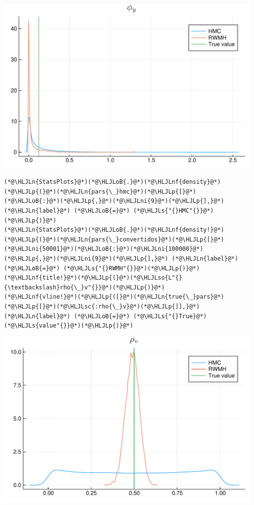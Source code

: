 \documentclass[12pt,a4paper]{article}
\newcommand{\HLJLn}[1]{#1}
\newcommand{\HLJLnf}[1]{\textcolor[RGB]{66,102,213}{#1}}
\newcommand{\HLJLs}[1]{\textcolor[RGB]{201,61,57}{#1}}
\newcommand{\HLJLsc}[1]{\textcolor[RGB]{201,61,57}{#1}}
\newcommand{\HLJLso}[1]{\textcolor[RGB]{201,61,57}{#1}}
\newcommand{\HLJLni}[1]{\textcolor[RGB]{59,151,46}{#1}}
\newcommand{\HLJLoB}[1]{\textcolor[RGB]{102,102,102}{\textbf{#1}}}
\newcommand{\HLJLp}[1]{#1}
\begin{document}
\includegraphics[width=\linewidth]{figures/dsge_and_julia_51_1.pdf}

\begin{lstlisting}
(*@\HLJLn{StatsPlots}@*)(*@\HLJLoB{.}@*)(*@\HLJLnf{density}@*)(*@\HLJLp{(}@*)(*@\HLJLn{pars{\_}hmc}@*)(*@\HLJLp{[}@*)(*@\HLJLoB{:}@*)(*@\HLJLp{,}@*)(*@\HLJLni{9}@*)(*@\HLJLp{],}@*) (*@\HLJLn{label}@*) (*@\HLJLoB{=}@*) (*@\HLJLs{"{}HMC"{}}@*)(*@\HLJLp{)}@*)
(*@\HLJLn{StatsPlots}@*)(*@\HLJLoB{.}@*)(*@\HLJLnf{density!}@*)(*@\HLJLp{(}@*)(*@\HLJLn{pars{\_}convertidos}@*)(*@\HLJLp{[}@*)(*@\HLJLni{50001}@*)(*@\HLJLoB{:}@*)(*@\HLJLni{100000}@*)(*@\HLJLp{,}@*)(*@\HLJLni{9}@*)(*@\HLJLp{],}@*) (*@\HLJLn{label}@*) (*@\HLJLoB{=}@*) (*@\HLJLs{"{}RWMH"{}}@*)(*@\HLJLp{)}@*)
(*@\HLJLnf{title!}@*)(*@\HLJLp{(}@*)(*@\HLJLso{L"{}{\textbackslash}rho{\_}v"{}}@*)(*@\HLJLp{)}@*)
(*@\HLJLnf{vline!}@*)(*@\HLJLp{([}@*)(*@\HLJLn{true{\_}pars}@*)(*@\HLJLp{[}@*)(*@\HLJLsc{:rho{\_}v}@*)(*@\HLJLp{]],}@*) (*@\HLJLn{label}@*) (*@\HLJLoB{=}@*) (*@\HLJLs{"{}True}@*) (*@\HLJLs{value"{}}@*)(*@\HLJLp{)}@*)
\end{lstlisting}

\includegraphics[width=\linewidth]{figures/dsge_and_julia_52_1.pdf}
\end{document}
